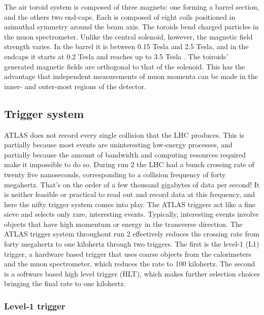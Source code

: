 The air toroid system is composed of three magnets: one forming a barrel section, and the others two end-caps. Each is composed of eight coils positioned in azimuthal symmetry around the beam axis. The toroids bend charged particles in the muon spectrometer. Unlike the central solenoid, however, the magnetic field strength varies. In the barrel it is between 0.15 Tesla and 2.5 Tesla, and in the endcaps it starts at 0.2 Tesla and reaches up to 3.5 Tesla . The toiroids' generated magnetic fields are orthogonal to that of the solenoid. This has the advantage that independent measurements of muon momenta can be made in the inner- and outer-most regions of the detector.

\subsection{Trigger system}

ATLAS does not record every single collision that the LHC produces. This is partially because most events are uninteresting low-energy processes, and partially because the amount of bandwidth and computing resources required make it impossible to do so. During run 2 the LHC had a bunch crossing rate of twenty five nanoseconds, corresponding to a collision frequency of forty megahertz. That's on the order of a few thousand gigabytes of data per second! It is neither feasible or practical to read out and record data at this frequency, and here the nifty trigger system comes into play. The ATLAS triggers act like a fine sieve and selects only rare, interesting events. Typically, interesting events involve objects that have high momentum or energy in the transverse direction. The ATLAS trigger system throughout run 2 effectively reduces the crossing rate from forty megahertz to one kilohertz through two triggers. The first is the level-1 (L1) trigger, a hardware based trigger that uses coarse objects from the calorimeters and the muon spectrometer, which reduces the rate to 100 kilohertz. The second is a software based high level trigger (HLT), which makes further selection choices bringing the final rate to one kilohertz. 

\subsubsection{Level-1 trigger}

